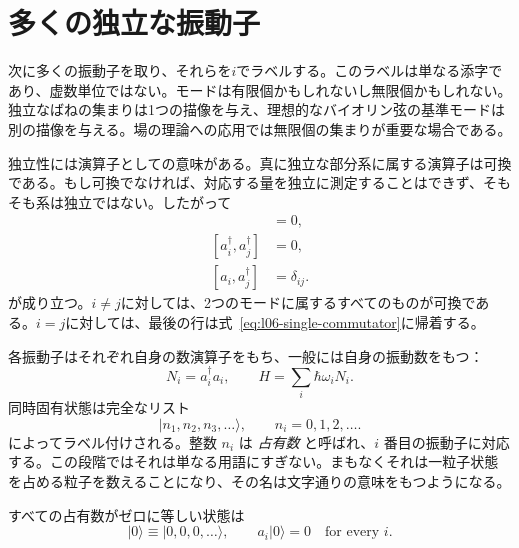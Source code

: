 \section{多くの独立な振動子}

次に多くの振動子を取り、それらを\(i\)でラベルする。このラベルは単なる添字であり、虚数単位ではない。モードは有限個かもしれないし無限個かもしれない。独立なばねの集まりは1つの描像を与え、理想的なバイオリン弦の基準モードは別の描像を与える。場の理論への応用では無限個の集まりが重要な場合である。

独立性には演算子としての意味がある。真に独立な部分系に属する演算子は可換である。もし可換でなければ、対応する量を独立に測定することはできず、そもそも系は独立ではない。したがって
\begin{align}
[a_i,a_j]&=0, \\
[a_i^\dagger,a_j^\dagger]&=0, \\
[a_i,a_j^\dagger]&=\delta_{ij}.
\label{eq:l06-many-commutators}
\end{align}
が成り立つ。\(i\ne j\)に対しては、2つのモードに属するすべてのものが可換である。\(i=j\)に対しては、最後の行は式~\eqref{eq:l06-single-commutator}に帰着する。

各振動子はそれぞれ自身の数演算子をもち、一般には自身の振動数をもつ：
\begin{equation}
N_i=a_i^\dagger a_i,
\qquad
H=\sum_i\hbar\omega_i N_i.
\label{eq:l06-many-hamiltonian}
\end{equation}
同時固有状態は完全なリスト
\begin{equation}
|n_1,n_2,n_3,\ldots\rangle,
\qquad n_i=0,1,2,\ldots.
\label{eq:l06-occupation-ket}
\end{equation}
によってラベル付けされる。整数 \(n_i\) は \emph{占有数} と呼ばれ、\(i\) 番目の振動子に対応する。この段階ではそれは単なる用語にすぎない。まもなくそれは一粒子状態を占める粒子を数えることになり、その名は文字通りの意味をもつようになる。

すべての占有数がゼロに等しい状態は
\begin{equation}
|0\rangle\equiv|0,0,0,\ldots\rangle,
\qquad a_i|0\rangle=0\quad\text{for every }i.
\label{eq:l06-oscillator-vacuum}
\end{equation}

\begin{classroomqa}
\end{classroomqa}

